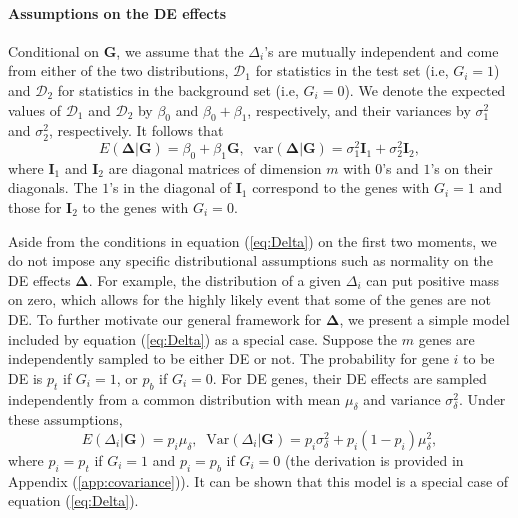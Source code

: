 	\paragraph{Assumptions on the DE effects}\label{subsection:DeltaModel}
	Conditional on $\bm G$, we assume that the $\Delta_i$'s are mutually independent and come from
	either of the two distributions, $\mathscr{D}_1$ for statistics in the test set (i.e, $G_i = 
	1$) and $\mathscr{D}_2$ for statistics in the background set (i.e, $G_i 
	= 0$). We denote the expected values of $\mathscr{D}_1$ and $\mathscr{D}_2$ by $\beta_0$ 
	and	$\beta_0+\beta_1$, respectively, and their variances by $\sigma_1^2$ and $\sigma_2^2$, 
    respectively. It follows that 
	\begin{equation}
	\label{eq:Delta}
	E(\bm \Delta|\bm G)=\beta_0 + \beta_1 \bm G,\;\; \mbox{var}(\bm \Delta|\bm G) = \sigma_1^2\bm
	I_1+\sigma_2^2\bm I_2,
	\end{equation} 
	where $\bm I_1$ and $\bm I_2$ are diagonal matrices of dimension $m$ with $0$'s and $1$'s on 
	their diagonals. The $1$'s in the diagonal of $\bm I_1$ correspond to the genes with $G_i=1$ 
	and those for $\bm I_2$ to the genes with $G_i=0$.
	
	Aside from the conditions in equation (\ref{eq:Delta}) on the first two moments, we do not 
	impose any specific distributional assumptions such as normality on the DE effects $\bm 
	\Delta$. For example, 
	the distribution of a given $\Delta_i$ can put positive mass on zero, which allows for the 
	highly likely event that some of the genes are not DE. To further motivate our general 
	framework for $\bm \Delta$, we present a simple model included by equation (\ref{eq:Delta}) as 
	a special case. Suppose the $m$ genes are independently sampled to be either DE or not. The 
	probability for gene $i$ to be DE is $p_t$ if $G_i=1$, or $p_b$ if $G_i=0$. For DE genes, their 
	DE effects are sampled independently from a common distribution with mean $\mu_\delta$ and 
	variance $\sigma^2_\delta$. Under these	assumptions, 
	\begin{equation}
	\label{eq:DeltaBinom}
	E(\Delta_i|\bm G) = p_i\mu_{\delta},\;\; \text{Var}(\Delta_i|\bm G)= p_i\sigma_{\delta}^2 +
	p_i(1-p_i)\mu_{\delta}^2,
	\end{equation}
	where $p_i=p_{t}$ if $G_i=1$ and $p_i=p_{b}$ if $G_i=0$ (the derivation is provided in Appendix 
	(\ref{app:covariance})). It can be shown that this model is a special case of equation 
	(\ref{eq:Delta}).
	
